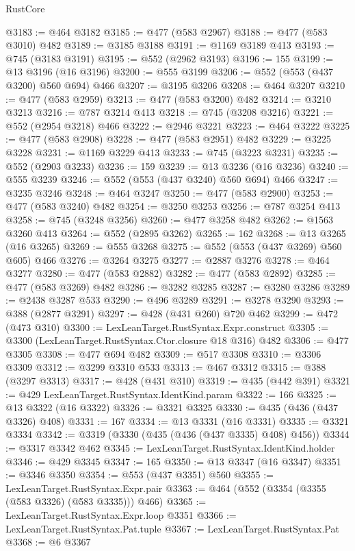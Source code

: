 \begin{lexlean}{RustCore}
\begin{coremodule}
@3183 := @464 @3182
@3185 := @477 (@583 @2967)
@3188 := @477 (@583 @3010) @482
@3189 := @3185 @3188
@3191 := @1169 @3189 @413
@3193 := @745 (@3183 @3191)
@3195 := @552 (@2962 @3193)
@3196 := 155
@3199 := @13 @3196 (@16 @3196)
@3200 := @555 @3199
@3206 := @552 (@553 (@437 @3200) @560 @694) @466
@3207 := @3195 @3206
@3208 := @464 @3207
@3210 := @477 (@583 @2959)
@3213 := @477 (@583 @3200) @482
@3214 := @3210 @3213
@3216 := @787 @3214 @413
@3218 := @745 (@3208 @3216)
@3221 := @552 (@2954 @3218) @466
@3222 := @2946 @3221
@3223 := @464 @3222
@3225 := @477 (@583 @2908)
@3228 := @477 (@583 @2951) @482
@3229 := @3225 @3228
@3231 := @1169 @3229 @413
@3233 := @745 (@3223 @3231)
@3235 := @552 (@2903 @3233)
@3236 := 159
@3239 := @13 @3236 (@16 @3236)
@3240 := @555 @3239
@3246 := @552 (@553 (@437 @3240) @560 @694) @466
@3247 := @3235 @3246
@3248 := @464 @3247
@3250 := @477 (@583 @2900)
@3253 := @477 (@583 @3240) @482
@3254 := @3250 @3253
@3256 := @787 @3254 @413
@3258 := @745 (@3248 @3256)
@3260 := @477 @3258 @482
@3262 := @1563 @3260 @413
@3264 := @552 (@2895 @3262)
@3265 := 162
@3268 := @13 @3265 (@16 @3265)
@3269 := @555 @3268
@3275 := @552 (@553 (@437 @3269) @560 @605) @466
@3276 := @3264 @3275
@3277 := @2887 @3276
@3278 := @464 @3277
@3280 := @477 (@583 @2882)
@3282 := @477 (@583 @2892)
@3285 := @477 (@583 @3269) @482
@3286 := @3282 @3285
@3287 := @3280 @3286
@3289 := @2438 @3287 @533
@3290 := @496 @3289
@3291 := @3278 @3290
@3293 := @388 (@2877 @3291)
@3297 := @428 (@431 @260) @720 @462
@3299 := @472 (@473 @310)
@3300 := LexLeanTarget.RustSyntax.Expr.construct
@3305 := @3300 (LexLeanTarget.RustSyntax.Ctor.closure @18 @316) @482
@3306 := @477 @3305
@3308 := @477 @694 @482
@3309 := @517 @3308
@3310 := @3306 @3309
@3312 := @3299 @3310 @533
@3313 := @467 @3312
@3315 := @388 (@3297 @3313)
@3317 := @428 (@431 @310)
@3319 := @435 (@442 @391)
@3321 := @429 LexLeanTarget.RustSyntax.IdentKind.param
@3322 := 166
@3325 := @13 @3322 (@16 @3322)
@3326 := @3321 @3325
@3330 := @435 (@436 (@437 @3326) @408)
@3331 := 167
@3334 := @13 @3331 (@16 @3331)
@3335 := @3321 @3334
@3342 := @3319 (@3330 (@435 (@436 (@437 @3335) @408) @456))
@3344 := @3317 @3342 @462
@3345 := LexLeanTarget.RustSyntax.IdentKind.holder
@3346 := @429 @3345
@3347 := 165
@3350 := @13 @3347 (@16 @3347)
@3351 := @3346 @3350
@3354 := @553 (@437 @3351) @560
@3355 := LexLeanTarget.RustSyntax.Expr.pair
@3363 := @464 (@552 (@3354 (@3355 (@583 @3326) (@583 @3335))) @466)
@3365 := LexLeanTarget.RustSyntax.Expr.loop @3351
@3366 := LexLeanTarget.RustSyntax.Pat.tuple
@3367 := LexLeanTarget.RustSyntax.Pat
@3368 := @6 @3367

\end{coremodule}
\end{lexlean}
